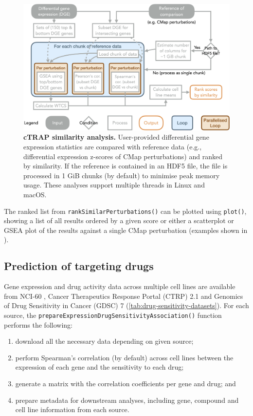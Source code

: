 \begin{figure}[!h]
  \includegraphics[width=.8\textwidth]{images/ctrap/analysis}
  \centering
  \caption[cTRAP similarity analysis]{\textbf{cTRAP similarity analysis.} User-provided differential gene expression statistics are compared with reference data (e.g., differential expression z-scores of CMap perturbations) and ranked by similarity. If the reference is contained in an HDF5 file, the file is processed in 1 GiB chunks (by default) to minimise peak memory usage. These analyses support multiple threads in Linux and macOS.}
  \label{fig:ctrap-analyses}
\end{figure}

The ranked list from \texttt{rankSimilarPerturbations()} can be plotted using \texttt{plot()}, showing a list of all results ordered by a given score or either a scatterplot or GSEA plot of the results against a single CMap perturbation (examples shown in ).

\subsection{Prediction of targeting drugs}

Gene expression and drug activity data across multiple cell lines are available from NCI-60 \cite{shoemaker:2006wi}, Cancer Therapeutics Response Portal (CTRP) 2.1 \cite{seashore-ludlow:2015ws} and Genomics of Drug Sensitivity in Cancer (GDSC) 7 \cite{yang:2012vk} (\autoref{tab:drug-sensitivity-datasets}). For each source, the \texttt{prepareExpressionDrugSensitivityAssociation()} function performs the following:

\begin{enumerate}
	\item download all the necessary data depending on given source;
	\item perform Spearman’s correlation (by default) across cell lines between the expression of each gene and the sensitivity to each drug;
	\item generate a matrix with the correlation coefficients per gene and drug; and
	\item prepare metadata for downstream analyses, including gene, compound and cell line information from each source.
\end{enumerate}

